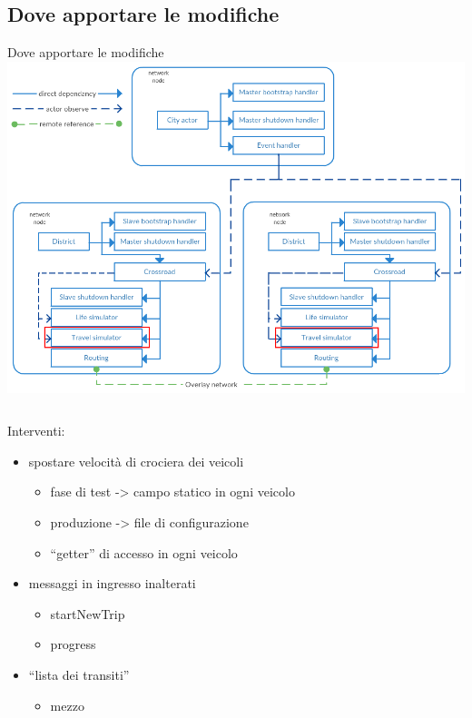 \subsection{Dove apportare le modifiche}
\begin{frame}{Dove apportare le modifiche}
	\only<1>
	{
		\centering
		\includegraphics[scale=0.27]{images/overtakingIntervents.png}
	}
	\only<2>
	{
		\begin{columns}
			\begin{column}{0.7\textwidth}
				Interventi:
				\begin{itemize}
					\item{\footnotesize{spostare velocità di crociera dei veicoli}}
					\begin{itemize}
						\item{\scriptsize{fase di test -> campo statico in ogni veicolo}}
						\item{\scriptsize{produzione -> file di configurazione}}
						\item{\scriptsize{``getter'' di accesso in ogni veicolo}}
					\end{itemize}
					\item{\footnotesize{messaggi in ingresso inalterati}}
					\begin{itemize}
						\item{\scriptsize{startNewTrip}}
						\item{\scriptsize{progress}}
					\end{itemize}
					\item{\footnotesize{``lista dei transiti''}}
					\begin{itemize}
						\item{\scriptsize{mezzo}}

\end{itemize}
\end{itemize}
\end{column}
\end{columns}}
\end{frame}
